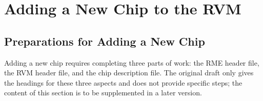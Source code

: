 \chapter{Adding a New Chip to the RVM}\label{ch:7-adding-a-new-chip}
\section{Preparations for Adding a New Chip}\label{sec:7-1}

Adding a new chip requires completing three parts of work: the RME header file, the RVM header file, and the chip description file. The original draft only gives the headings for these three aspects and does not provide specific steps; the content of this section is to be supplemented in a later version.

